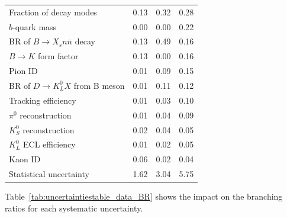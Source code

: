 \begin{table}
\begin{tabular}{ p{6cm} p{2.5cm} p{2.5cm} p{2.5cm}}
Fraction of decay modes & 0.13 & 0.32 & 0.28 \\
$b$-quark mass & 0.00 & 0.00 & 0.22 \\
BR of $B\rightarrow X_{s} n\bar{n}$ decay & 0.13 & 0.49 & 0.16 \\
$B\rightarrow K$ form factor & 0.13 & 0.00 & 0.16 \\
Pion ID & 0.01 & 0.09 & 0.15 \\
BR of $D \rightarrow K_{L}^{0} X$ from B meson & 0.01 & 0.11 & 0.12 \\
Tracking efficiency & 0.01 & 0.03 & 0.10 \\
$\pi^{0}$ reconstruction & 0.01 & 0.04 & 0.09 \\
$K_{S}^{0}$ reconstruction & 0.02 & 0.04 & 0.05 \\
$K_{L}^{0}$ ECL efficiency & 0.01 & 0.02 & 0.05 \\
Kaon ID & 0.06 & 0.02 & 0.04 \\
\hline
Statistical uncertainty & 1.62 & 3.04 & 5.75 \\
         \hline
            \hline
\end{tabular}
    \label{tab:uncertaintiestable_data}
\end{table}
Table~\ref{tab:uncertaintiestable_data_BR} shows the impact on the branching ratios for each systematic uncertainty.

